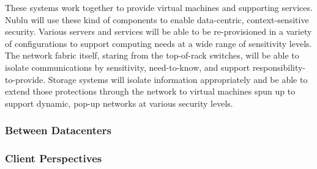 \documentclass[12pt,letterpaper]{article}
\begin{document}
These systems work together to provide virtual machines and supporting services.  Nublu will use these kind of components to enable data-centric, context-sensitive security.  Various servers and services will be able to be re-provisioned in a variety of configurations to support computing needs at a wide range of sensitivity levels.  The network fabric itself, staring from the top-of-rack switches, will be able to isolate communications by sensitivity, need-to-know, and support responsibility-to-provide.  Storage systems will isolate information appropriately and be able to extend those protections through the network to virtual machines spun up to support dynamic, pop-up networks at various security levels.

\subsubsection{Between Datacenters}

\subsubsection{Client Perspectives}

\printbibliography
\end{document}
